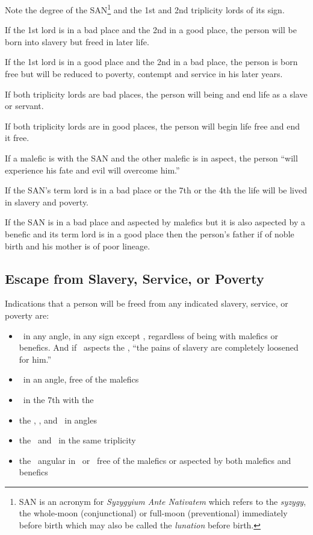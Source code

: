 Note the degree of the SAN\footnote{SAN is an acronym for \textsl{Syzygyium Ante Nativatem} which refers to the \textsl{syzygy}, the whole-moon (conjunctional) or full-moon (preventional) immediately before birth which may also be called the \textsl{lunation} before birth.} and the 1st and 2nd triplicity lords of its sign. 

If the 1st lord is in a bad place and the 2nd in a good place, the person will be born into slavery but freed in later life.

If the 1st lord is in a good place and the 2nd in a bad place, the person is born free but will be reduced to poverty, contempt and service in his later years.

If both triplicity lords are bad places, the person will being and end life as a slave or servant.

If both triplicity lords are in good places, the person will begin life free and end it free.

If a malefic is with the SAN and the other malefic is in aspect, the person ``will experience his fate and evil will overcome him.''

If the SAN's term lord is in a bad place or the 7th or the 4th the life will be lived in slavery and poverty.

If the SAN is in a bad place and aspected by malefics but it is also aspected by a benefic and its term lord is in a good place then the person's father if of noble birth and his mother is of poor lineage.

\subsection{Escape from Slavery, Service, or Poverty}
Indications that a person will be freed from any indicated slavery, service, or poverty are:
\begin{itemize}[topsep=0em, itemsep=0em]
\item \Jupiter\,  in any angle, in any sign except \Capricorn, regardless of being with malefics or benefics. And if \Jupiter\, aspects the \Moon, ``the pains of slavery are completely loosened for him.''

\item \Venus\, in an angle, free of the malefics

\item \Venus\,  in the 7th with the \Moon

\item the \Sun, \Moon, and \Mercury\, in angles
\item the \Sun\, and \Moon\, in the same triplicity
\item the \Moon\, angular in \Taurus\, or \Cancer\, free of the malefics or aspected by both malefics and benefics
\end{itemize}

